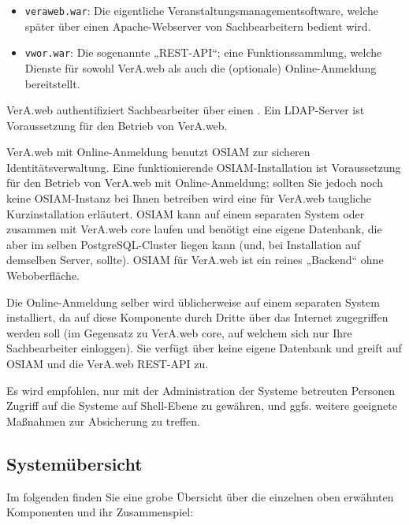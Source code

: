 \begin{itemize}
 \item{\texttt{veraweb.war}: Die eigentliche Veranstaltungsmanagementsoftware,
  welche später über einen Apache-Webserver von Sachbearbeitern bedient wird.}
 \item{\texttt{vwor.war}: Die sogenannte „REST-API“; eine Funktionssammlung,
  welche Dienste für sowohl VerA.web als auch die (optionale) Online-Anmeldung
  bereitstellt.}
\end{itemize}

VerA.web authentifiziert Sachbearbeiter über einen .
Ein LDAP-Server ist Voraussetzung für den Betrieb von VerA.web.

\ifoa
VerA.web mit Online-Anmeldung benutzt OSIAM zur sicheren Identitätsverwaltung.
Eine funktionierende OSIAM-Installation ist Voraussetzung für den Betrieb von
VerA.web mit Online-Anmeldung; sollten Sie jedoch noch keine OSIAM-Instanz bei
Ihnen betreiben wird eine für VerA.web taugliche Kurzinstallation erläutert.
OSIAM kann auf einem separaten System oder zusammen mit VerA.web core laufen
und benötigt eine eigene Datenbank, die aber im selben PostgreSQL-Cluster
liegen kann (und, bei Installation auf demselben Server, sollte). OSIAM für
VerA.web ist ein reines „Backend“ ohne Weboberfläche.

Die Online-Anmeldung selber wird üblicherweise auf einem separaten System
installiert, da auf diese Komponente durch Dritte über das Internet
zugegriffen werden soll (im Gegensatz zu VerA.web core, auf welchem
sich nur Ihre Sachbearbeiter einloggen). Sie verfügt über keine eigene
Datenbank und greift auf OSIAM und die VerA.web REST-API zu.
\fi%

Es wird empfohlen, nur mit der Administration der Systeme betreuten
Personen Zugriff auf die Systeme auf Shell-Ebene zu gewähren, und
ggfs. weitere geeignete Maßnahmen zur Absicherung zu treffen.

\ifoa

\subsection{Systemübersicht}\label{subsec:intro-overview-blocks}

Im folgenden finden Sie eine grobe Übersicht über die einzelnen oben
erwähnten Komponenten und ihr Zusammenspiel:\keinumbruch

